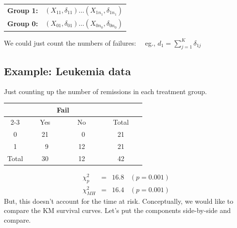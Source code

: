 \documentclass[11pt,slidesonly,semrot,portrait,palatino]{book}
\begin{document}
\begin{tabular}{ll}
{\bf Group 1:} &  $(X_{11},\delta_{11}) \dots (X_{1n_1},\delta_{1n_1})$\\[2ex]
{\bf Group 0:} &  $(X_{01},\delta_{01}) \dots (X_{0n_0},\delta_{0n_0})$\\[2ex]
\end{tabular}
We could just count the numbers of failures:
~~eg., $d_1=\sum_{j=1}^K \delta_{1j}$
{\subsection{Example: Leukemia data}
Just counting up the number of remissions in each treatment group.
\begin{center}
\begin{tabular}{cccc}
\hline \hline
& \multicolumn{2}{c}{Fail} &  \\ \cline{2-3}
\multicolumn{1}{c}{Group } & ~~~Yes~~~ & ~~~No~~~ &  ~~~Total~~~  \\ \hline
0 &  21  &   ~0  & 21        \\
1 &  ~9   &  12  & 21        \\
\hline
Total & 30  & 12 & 42    \\ \hline \hline
\end{tabular}
\end{center}
\begin{eqnarray*}
\chi^2_p & = & 16.8 ~~~~ (p=0.001)\\
\chi^2_{MH} & = & 16.4 ~~~~ (p=0.001)
\end{eqnarray*}
But, this doesn't account for the time at risk. Conceptually, we would like to compare the KM survival curves.
Let's put the components side-by-side and compare.
}
\end{document}
